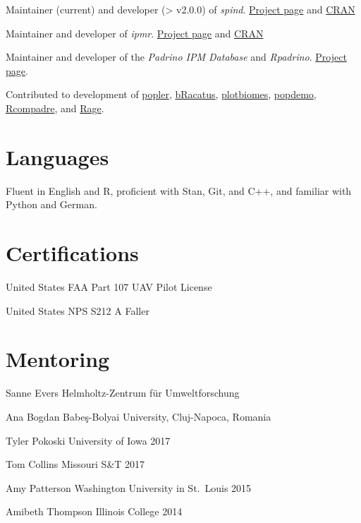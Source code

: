 \documentclass[11pt,]{article}
\begin{document}
Maintainer (current) and developer (\textgreater{} v2.0.0) of
\emph{spind}. \href{https://github.com/levisc8/spind}{Project page} and
\href{https://cran.r-project.org/package=spind}{CRAN}

Maintainer and developer of \emph{ipmr}.
\href{https://levisc8.github.io/ipmr/}{Project page} and
\href{https://cran.r-project.org/package=ipmr}{CRAN}

Maintainer and developer of the \emph{Padrino IPM Database} and
\emph{Rpadrino}. \href{https://levisc8.github.io/Padrino/}{Project
page}.

Contributed to development of
\href{https://github.com/AldoCompagnoni/popler}{popler},
\href{https://github.com/EduardoArle/bRacatus}{bRacatus},
\href{https://github.com/valentinitnelav/plotbiomes}{plotbiomes},
\href{https://github.com/iainmstott/popdemo}{popdemo},
\href{https://github.com/jonesor/Rcompadre}{Rcompadre}, and
\href{https://github.com/jonesor/Rage}{Rage}.

\hypertarget{languages}{%
\section{Languages}\label{languages}}

Fluent in English and R, proficient with Stan, Git, and C++, and
familiar with Python and German.

\hypertarget{certifications}{%
\section{Certifications}\label{certifications}}

United States FAA Part 107 UAV Pilot License

United States NPS S212 A Faller

\hypertarget{mentoring}{%
\section{Mentoring}\label{mentoring}}

Sanne Evers \hfill Helmholtz-Zentrum für Umweltforschung

Ana Bogdan \hfill Babe\c s-Bolyai University, Cluj-Napoca, Romania

Tyler Pokoski \hfill  University of Iowa 2017

Tom Collins \hfill Missouri S\&T 2017

Amy Patterson \hfill Washington University in St.~Louis 2015

Amibeth Thompson \hfill Illinois College 2014
\end{document}
